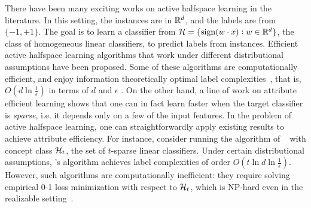 There have been many exciting works on active halfspace learning in the literature.
In this setting, the instances are in $\mathbb{R}^d$, and the labels are from $\{-1,+1\}$. The goal is to learn a classifier from $\mathcal{H} = \{\operatorname{sign}(w \cdot x): w \in \mathbb{R}^d \}$, the class of homogeneous linear classifiers, to predict labels from instances.
Efficient active halfspace learning algorithms that work under different distributional assumptions have been proposed. Some of these algorithms are computationally efficient, and enjoy
information theoretically optimal label complexities~\citep{DKM05, BBZ07, ABL17, HKY15, ABHU15, YZ17}, that is,
$O(d \ln\frac 1 \epsilon)$ in terms of $d$ and $\epsilon$ \citep[See e.g.][for an $\Omega(d \ln\frac 1 \epsilon)$ lower bound]{KMT93}.
On the other hand, a line of work on attribute efficient learning \citep{B90} shows that one can in fact learn faster
when the target classifier is {\em sparse}, i.e. it depends only on a few of the input features.
In the problem of active halfspace learning, one can straightforwardly apply existing results to achieve attribute efficiency.
For instance, consider running the algorithm of ~\cite{ZC14} with concept class $\mathcal{H}_t$, the set of $t$-sparse linear classifiers. Under certain distributional assumptions, \cite{ZC14}'s algorithm achieves label complexities of order $O(t \ln d \ln\frac 1 \epsilon)$. However, such algorithms are computationally inefficient: they require solving empirical 0-1 loss minimization with respect to $\mathcal{H}_t$, which is NP-hard even in the realizable setting~\citep{N95}.



